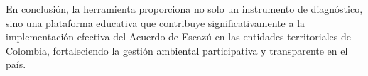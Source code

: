 \documentclass[12pt,a4paper]{report}
\begin{document}
En conclusión, la herramienta proporciona no solo un instrumento de diagnóstico, sino una plataforma educativa que contribuye significativamente a la implementación efectiva del Acuerdo de Escazú en las entidades territoriales de Colombia, fortaleciendo la gestión ambiental participativa y transparente en el país.
\end{document}
